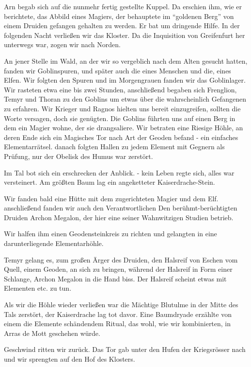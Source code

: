 Arn begab sich auf die nunmehr fertig gestellte Kuppel. Da erschien ihm, wie er berichtete, das Abbild eines Magiers, der behauptete im ``goldenen Berg'' von einem Druiden gefangen gehalten zu werden. Er bat um dringende Hilfe.
In der folgenden Nacht verließen wir das Kloster. Da die Inquisition von Greifenfurt her unterwegs war, zogen wir nach Norden.

An jener Stelle im Wald, an der wir so vergeblich nach dem Alten gesucht hatten, fanden wir Goblinspuren, und später auch die eines Menschen und die, eines Elfen. Wir folgten den Spuren und im Morgengrauen fanden wir das Goblinlager. Wir rasteten etwa eine bis zwei Stunden, anschließend begaben sich Frenglion, Temyr und Thoran zu den Goblins um etwas über die wahrscheinlich Gefangenen zu erfahren. Wir Krieger und Ragnos hielten uns bereit einzugreifen, sollten die Worte versagen, doch sie genügten. Die Goblins führten uns auf einen Berg in dem ein Magier wohne, der sie drangsaliere. Wir betraten eine Riesige Höhle, an deren Ende sich ein Magisches Tor nach Art der Geoden befand - ein einfaches Elementarrätsel. danach folgten Hallen zu jedem Element mit Gegnern als Prüfung, nur der Obelisk des Humus war zerstört.

Im Tal bot sich ein erschrecken der Anblick. - kein Leben regte sich, alles war versteinert. Am größten Baum lag ein angeketteter Kaiserdrache-Stein.

Wir fanden bald eine Hütte mit dem zugerichteten Magier und dem Elf. anschließend fanden wir auch den Verantwortlichen Den berühmt-berüchtigten Druiden Archon Megalon, der hier eine seiner Wahnwitzigen Studien betrieb.

Wir halfen ihm einen Geodensteinkreis zu richten und gelangten in eine darunterliegende Elementarhöhle.

Temyr gelang es, zum großen Ärger des Druiden, den Halsreif von Eschen vom Quell, einem Geoden, an sich zu bringen, während der Halsreif in Form einer Schlange, Archon Megalon in die Hand biss. Der Halsreif scheint etwas mit Elementen etc. zu tun.

Als wir die Höhle wieder verließen war die Mächtige Blutulme in der Mitte des Tals zerstört, der Kaiserdrache lag tot davor. Eine Baumdryade erzählte von einem die Elemente schändendem Ritual, das wohl, wie wir kombinierten, in Arras de Mott geschehen würde.

Geschwind ritten wir zurück. Das Tor gab unter den Hufen der Kriegsrösser nach und wir sprengten auf den Hof des Klosters.

